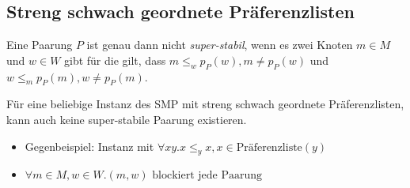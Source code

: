 \begin{frame}
\end{frame}

\subsection{Streng schwach geordnete Präferenzlisten}
\begin{frame}
  \begin{Definition}
  \label{super-stabil}
    Eine Paarung $P$ ist genau dann nicht \textit{super-stabil}, wenn es zwei Knoten $m \in M$ und $w \in W$ gibt für die gilt, dass $m \leq_{w} p_{P}(w), m \neq p_{P}(w)$ und $w \leq_{m} p_{P}(m), w \neq p_{P}(m)$.
  \end{Definition}
\end{frame}

\begin{frame}
  \begin{Proposition}
  \label{keine_super-stabil}
    Für eine beliebige Instanz des SMP mit streng schwach geordnete Präferenzlisten, kann auch keine super-stabile Paarung existieren.
  \end{Proposition}

  \begin{Beweis}
  \label{keine_super-stabil_bew}
  \begin{itemize} [<+->]
      \item Gegenbeispiel: Instanz mit $\forall x y. x \leq_{y} x, x \in \textrm{Pr\"aferenzliste}(y)$
      \item $\forall m \in M,w \in W. (m,w) \textrm{ blockiert jede Paarung}$
   \end{itemize}
  \end{Beweis}
\end{frame}

